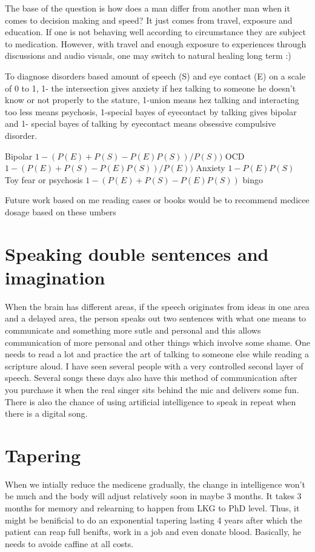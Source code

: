 \documentclass[a4paper]{article}
\begin{document}
The base of the question is how does a man differ from another man when it comes to decision making and speed? It just comes from travel, exposure and education. If one is not behaving well according to circumstance they are subject to medication. However, with travel and enough exposure to experiences through discussions and audio visuals, one may switch to natural healing long term :)

To diagnose disorders based amount of speech (S) and eye contact (E) on a scale of 0 to 1, 1- the intersection gives anxiety if hez talking to someone he doesn't know or not properly to the stature, 1-union means hez talking and interacting too less means psychosis, 1-special bayes of eyecontact by talking gives bipolar and 1- special bayes of talking by eyecontact means obsessive compulsive disorder.

Bipolar $1-(P(E)+P(S)-P(E)P(S))/P(S))$
OCD $1-(P(E)+P(S)-P(E)P(S))/P(E))$
Anxiety $1-P(E)P(S)$ 
Toy fear or psychosis $1-(P(E)+P(S)-P(E)P(S))$ bingo

Future work based on me reading cases or books would be to recommend medicee dosage based on these umbers

\section{Speaking double sentences and imagination}

When the brain has different areas, if the speech originates from ideas in one area and a delayed area, the person speaks out two sentences with what one means to communicate and something more sutle and personal and this allows communication of more personal and other things which involve some shame. One needs to read a lot and practice the art of talking to someone else while reading a scripture aloud. I have seen several people with a very controlled second layer of speech. Several songs these days also have this method of communication after you purchase it when the real singer sits behind the mic and delivers some fun. There is also the chance of using artificial intelligence to speak in repeat when there is a digital song.

\section{Tapering}
When we intially reduce the medicene gradually, the change in intelligence won't be much and the body will adjust relatively soon in maybe 3 months. It takes 3 months for memory and relearning to happen from LKG to PhD level. Thus, it might be benificial to do an exponential tapering lasting 4 years after which the patient can reap full benifts, work in a job and even donate blood. Basically, he needs to avoide caffine at all costs.
\end{document}
